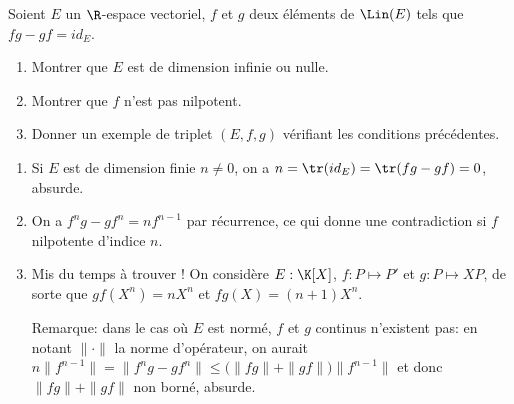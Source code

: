 \begin{enonce}
\begin{exercise}[ID={RMS134 E574},subtitle={Oral
    Mines-Ponts},theme={algebre},annee={2023},concours={mines-ponts},filiere={MP}]
Soient $E$ un $\R$-espace vectoriel, $f$ et $g$ deux éléments de
$\Lin(E)$ tels que $fg-gf=id_E$.
\begin{enumerate}
\item Montrer que $E$ est de dimension infinie ou nulle.
\item Montrer que $f$ n'est pas nilpotent.
\item Donner un exemple de triplet $(E,f,g)$ vérifiant les conditions
  précédentes.
\end{enumerate}
\end{exercise}
\begin{solution}
  \begin{enumerate}
  \item Si $E$ est de dimension finie $n\neq 0$, on a
    $n=\tr(id_E)=\tr(fg-gf)=0$, absurde.
  \item On a $f^ng-gf^n=nf^{n-1}$ par récurrence, ce qui donne une
    contradiction si $f$ nilpotente d'indice $n$.
  \item Mis du temps à trouver ! On considère $E:\K[X]$, $f:P\mapsto
    P'$ et $g:P\mapsto XP$, de sorte que $gf(X^n)=nX^n$ et
    $fg(X)=(n+1)X^n$.
    
    Remarque: dans le cas où $E$ est normé, $f$ et $g$ continus
    n'existent pas: en notant $\|\cdot\|$ la norme d'opérateur, on aurait
    $n\|f^{n-1}\|=\|f^ng-gf^n\|\le \big(\|fg\|+\|gf\|\big)\|f^{n-1}\|$
    et donc $\|fg\|+\|gf\|$ non borné, absurde.
  \end{enumerate}
\end{solution}
\end{enonce}
